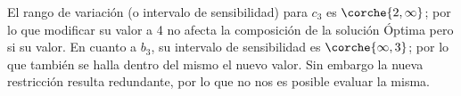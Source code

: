 \begin{homeworkProblem}[-1][Gran M...]
El rango de variación (o intervalo de sensibilidad) para $c_3$ es $\corche{2,\infty}$; por lo que modificar su valor a 4 no afecta la composición de la solución Óptima pero si su valor.
En cuanto a $b_3$, su intervalo de sensibilidad es $\corche{\infty,3}$; por lo que también se halla dentro del mismo el nuevo valor. Sin embargo la nueva restricción resulta redundante, por lo que no nos es posible evaluar la misma. 
\end{homeworkProblem}
